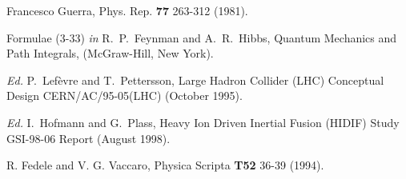 \documentclass[]{article}
\begin{document}
\begin{thebibliography}{99}
Francesco Guerra,
Phys. Rep. {\bf 77} 263-312 (1981).

Formulae (3-33) {\em in}
R.~P.~Feynman and A.~R.~Hibbs,
Quantum Mechanics and Path Integrals,
(McGraw-Hill, New York).

{\em Ed.}
P.~Lef\`{e}vre and T.~Pettersson,
Large Hadron Collider (LHC) Conceptual Design
CERN/AC/95-05(LHC)
(October 1995).

{\em Ed.} I.~Hofmann and G.~Plass,
Heavy Ion Driven Inertial Fusion (HIDIF) Study
GSI-98-06 Report (August 1998).

R. Fedele and V. G. Vaccaro,
Physica Scripta {\bf T52} 36-39 (1994).

\end{thebibliography}
\end{document}
